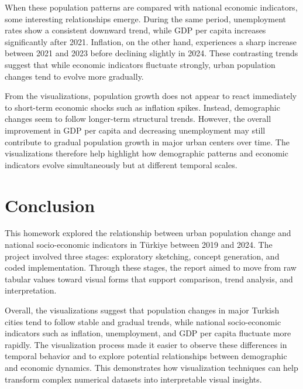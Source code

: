 \documentclass[11pt,a4paper]{article}
\begin{document}
When these population patterns are compared with national economic indicators, some interesting relationships emerge. During the same period, unemployment rates show a consistent downward trend, while GDP per capita increases significantly after 2021. Inflation, on the other hand, experiences a sharp increase between 2021 and 2023 before declining slightly in 2024. These contrasting trends suggest that while economic indicators fluctuate strongly, urban population changes tend to evolve more gradually.

From the visualizations, population growth does not appear to react immediately to short-term economic shocks such as inflation spikes. Instead, demographic changes seem to follow longer-term structural trends. However, the overall improvement in GDP per capita and decreasing unemployment may still contribute to gradual population growth in major urban centers over time. The visualizations therefore help highlight how demographic patterns and economic indicators evolve simultaneously but at different temporal scales.

\section{Conclusion}

This homework explored the relationship between urban population change and national socio-economic indicators in Türkiye between 2019 and 2024. The project involved three stages: exploratory sketching, concept generation, and coded implementation. Through these stages, the report aimed to move from raw tabular values toward visual forms that support comparison, trend analysis, and interpretation.

Overall, the visualizations suggest that population changes in major Turkish cities tend to follow stable and gradual trends, while national socio-economic indicators such as inflation, unemployment, and GDP per capita fluctuate more rapidly. The visualization process made it easier to observe these differences in temporal behavior and to explore potential relationships between demographic and economic dynamics. This demonstrates how visualization techniques can help transform complex numerical datasets into interpretable visual insights.
\end{document}
